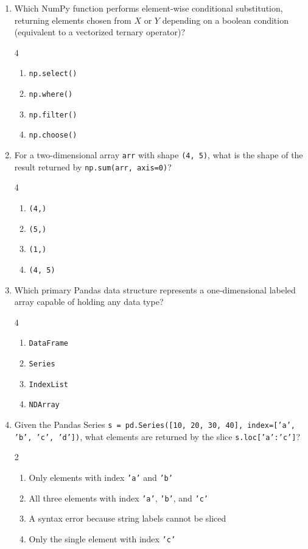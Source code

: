 \documentclass[11pt,a4paper]{article}
\begin{document}
\begin{enumerate}[leftmargin=*,itemsep=2.5pt,resume]
\item Which NumPy function performs element-wise conditional substitution, returning elements chosen from $X$ or $Y$ depending on a boolean condition (equivalent to a vectorized ternary operator)?
\begin{multicols}{4}
\begin{enumerate}[label=\Alph*.]
  \item \texttt{np.select()}
  \item \texttt{np.where()}
  \item \texttt{np.filter()}
  \item \texttt{np.choose()}
\end{enumerate}
\end{multicols}

\item For a two-dimensional array \texttt{arr} with shape \texttt{(4, 5)}, what is the shape of the result returned by \texttt{np.sum(arr, axis=0)}?
\begin{multicols}{4}
\begin{enumerate}[label=\Alph*.]
  \item \texttt{(4,)}
  \item \texttt{(5,)}
  \item \texttt{(1,)}
  \item \texttt{(4, 5)}
\end{enumerate}
\end{multicols}

\item Which primary Pandas data structure represents a one-dimensional labeled array capable of holding any data type?
\begin{multicols}{4}
\begin{enumerate}[label=\Alph*.]
  \item \texttt{DataFrame}
  \item \texttt{Series}
  \item \texttt{IndexList}
  \item \texttt{NDArray}
\end{enumerate}
\end{multicols}

\item Given the Pandas Series \texttt{s = pd.Series([10, 20, 30, 40], index=['a', 'b', 'c', 'd'])}, what elements are returned by the slice \texttt{s.loc['a':'c']}?
\begin{multicols}{2}
\begin{enumerate}[label=\Alph*.]
  \item Only elements with index \texttt{'a'} and \texttt{'b'}
  \item All three elements with index \texttt{'a'}, \texttt{'b'}, and \texttt{'c'}
  \item A syntax error because string labels cannot be sliced
  \item Only the single element with index \texttt{'c'}
\end{enumerate}
\end{multicols}


\end{enumerate}
\end{document}
